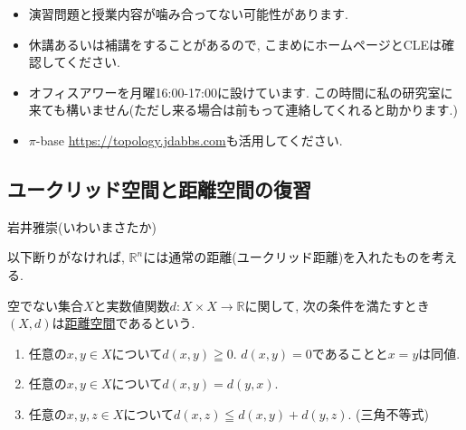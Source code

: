 \documentclass[dvipdfmx,a4paper,11pt]{article}
\newcommand{\R}{\mathbb{R}}
\theoremstyle{definition}
\begin{document}
\vspace{11pt}
\begin{itemize}
  \setlength{\parskip}{0cm} %
  \setlength{\itemsep}{0cm} %
    \item 演習問題と授業内容が噛み合ってない可能性があります.
  \item 休講あるいは補講をすることがあるので, こまめにホームページとCLEは確認してください.
    \item オフィスアワーを月曜16:00-17:00に設けています. この時間に私の研究室に来ても構いません(ただし来る場合は前もって連絡してくれると助かります.)
    \item $\pi$-base \url{https://topology.jdabbs.com}も活用してください. 
 \end{itemize}
 
\newpage

\begin{center}
\section{ユークリッド空間と距離空間の復習}
\label{sec-euc}
\end{center}
\begin{flushright}
 岩井雅崇(いわいまさたか)
\end{flushright}

以下断りがなければ, $\R^{n}$には通常の距離(ユークリッド距離)を入れたものを考える. 
\begin{tcolorbox}[
    colback = white,
    colframe = green!35!black,
    fonttitle = \bfseries,
    breakable = true]
    空でない集合$X$と実数値関数$d : X \times X \rightarrow \R$に関して, 次の条件を満たすとき$(X,d)$は\underline{距離空間}であるという.
    \begin{enumerate}
    \setlength{\parskip}{0cm} 
  \setlength{\itemsep}{0cm} 
    \item 任意の$x,y \in X$について$d(x,y) \geqq 0$. $d(x,y)=0$であることと$x=y$は同値. 
    \item 任意の$x,y \in X$について$d(x,y)=d(y,x)$.
    \item 任意の$x,y,z \in X$について$d(x,z) \leqq d(x,y) + d(y,z)$. (三角不等式)
    \end{enumerate}
 \end{tcolorbox}
 
\end{document}
